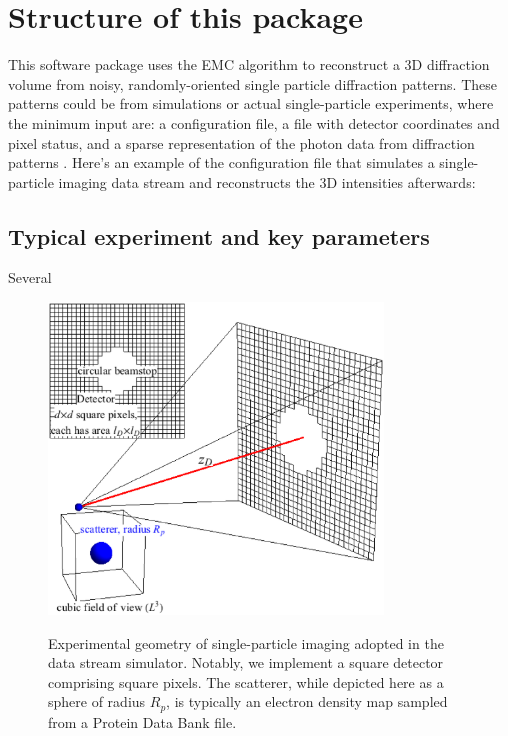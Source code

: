 \documentclass[]{iucr}              %
\begin{document}
\section{Structure of this package}\label{sec:package}
This software package uses the EMC algorithm to reconstruct a 3D diffraction volume from noisy, randomly-oriented single particle diffraction patterns. These patterns could be from simulations or actual single-particle experiments, where the minimum input are: a configuration file, a file with detector coordinates and pixel status, and a sparse representation of the photon data from diffraction patterns . Here's an example of the configuration file that simulates a single-particle imaging data stream and reconstructs the 3D intensities afterwards:


\subsection{Typical experiment and key parameters}\label{sec:expParams}
Several 

\begin{figure}
\caption{Experimental geometry of single-particle imaging adopted in the data stream simulator. Notably, we implement a square detector comprising square pixels. The scatterer, while depicted here as a sphere of radius $R_p$, is typically an electron density map sampled from a Protein Data Bank file.}
\includegraphics[width=3.5in]{figures/geometry.eps} \label{fig:expGeometry}
\end{figure}
\end{document}
